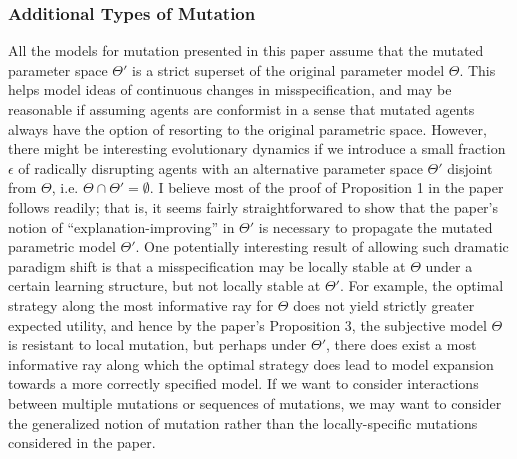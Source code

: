 \documentclass[10pt,letter]{article}
\begin{document}
\subsubsection*{Additional Types of Mutation}
All the models for mutation presented in this paper assume that the mutated parameter space $\Theta'$ is a strict superset of the original parameter model $\Theta$. This helps model ideas of continuous changes in misspecification, and may be reasonable if assuming agents are conformist in a sense that mutated agents always have the option of resorting to the original parametric space. However, there might be interesting evolutionary dynamics if we introduce a small fraction $\epsilon$ of radically disrupting agents with an alternative parameter space $\Theta'$ disjoint from $\Theta$, i.e. $\Theta \cap \Theta' = \emptyset$. I believe most of the proof of Proposition 1 in the paper follows readily; that is, it seems fairly straightforwared to show that the paper's notion of ``explanation-improving'' in $\Theta'$ is necessary to propagate the mutated parametric model $\Theta'$. One potentially interesting result of allowing such dramatic paradigm shift is that a misspecification may be locally stable at $\Theta$ under a certain learning structure, but not locally stable at $\Theta'$. For example, the optimal strategy along the most informative ray for $\Theta$ does not yield strictly greater expected utility, and hence by the paper's Proposition 3, the subjective model $\Theta$ is resistant to local mutation, but perhaps under $\Theta'$, there does exist a most informative ray along which the optimal strategy does lead to model expansion towards a more correctly specified model. If we want to consider interactions between multiple mutations or sequences of mutations, we may want to consider the generalized notion of mutation rather than the locally-specific mutations considered in the paper.
\end{document}
